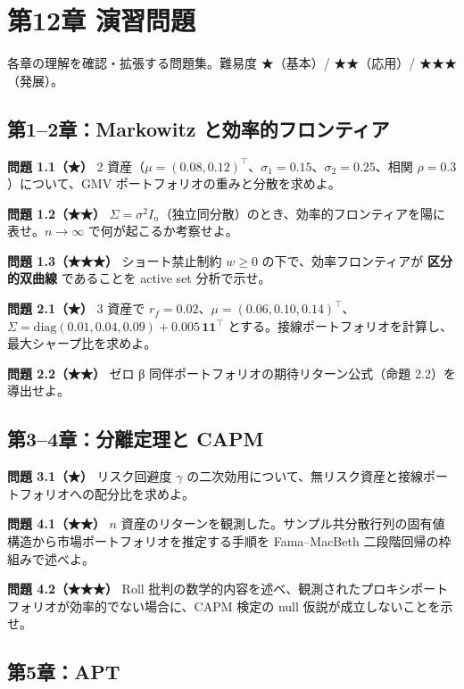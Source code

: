 \documentclass[11pt,a4paper]{report}
\begin{document}
\chapter{第12章 演習問題}

各章の理解を確認・拡張する問題集。難易度 ★（基本）/ ★★（応用）/ ★★★（発展）。

\section{第1–2章：Markowitz と効率的フロンティア}

\textbf{問題 1.1（★）} 2 資産（$\mu = (0.08, 0.12)^\top$、$\sigma_1 = 0.15$、$\sigma_2 = 0.25$、相関 $\rho = 0.3$）について、GMV ポートフォリオの重みと分散を求めよ。

\textbf{問題 1.2（★★）} $\Sigma = \sigma^2 I_n$（独立同分散）のとき、効率的フロンティアを陽に表せ。$n \to \infty$ で何が起こるか考察せよ。

\textbf{問題 1.3（★★★）} ショート禁止制約 $w \ge 0$ の下で、効率フロンティアが \textbf{区分的双曲線} であることを active set 分析で示せ。

\textbf{問題 2.1（★）} 3 資産で $r_f = 0.02$、$\mu = (0.06, 0.10, 0.14)^\top$、$\Sigma = \mathrm{diag}(0.01, 0.04, 0.09) + 0.005\, \mathbf{1}\mathbf{1}^\top$ とする。接線ポートフォリオを計算し、最大シャープ比を求めよ。

\textbf{問題 2.2（★★）} ゼロ β 同伴ポートフォリオの期待リターン公式（命題 2.2）を導出せよ。

\section{第3–4章：分離定理と CAPM}

\textbf{問題 3.1（★）} リスク回避度 $\gamma$ の二次効用について、無リスク資産と接線ポートフォリオへの配分比を求めよ。

\textbf{問題 4.1（★★）} $n$ 資産のリターンを観測した。サンプル共分散行列の固有値構造から市場ポートフォリオを推定する手順を Fama–MacBeth 二段階回帰の枠組みで述べよ。

\textbf{問題 4.2（★★★）} Roll 批判の数学的内容を述べ、観測されたプロキシポートフォリオが効率的でない場合に、CAPM 検定の null 仮説が成立しないことを示せ。

\section{第5章：APT}
\end{document}
